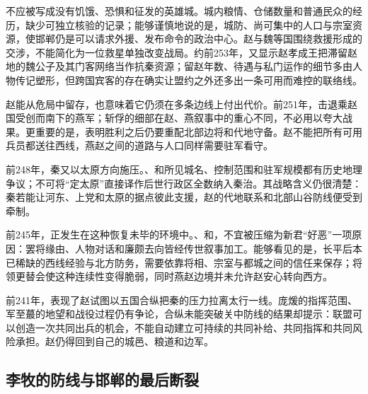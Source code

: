 不应被写成没有饥饿、恐惧和征发的英雄城。城内粮情、仓储数量和普通民众的经历，缺少可独立核验的记录；能够谨慎地说的是，城防、尚可集中的人口与宗室资源，使邯郸仍是可以请求外援、发布命令的政治中心。赵与魏等国围绕救援形成的交涉，不能简化为一位救星单独改变战局。约前253年，又显示赵孝成王把滞留赵地的魏公子及其门客网络当作抗秦资源；留赵年数、待遇与私门运作的细节多由人物传记塑形，但跨国宾客的存在确实让盟约之外还多出一条可用而难控的联络线。

赵能从危局中留存，也意味着它仍须在多条边线上付出代价。前251年，击退乘赵国受创而南下的燕军；斩俘的细部在赵、燕叙事中的重心不同，不必用以夸大战果。更重要的是，表明胜利之后仍要重配北部边将和代地守备。赵不能把所有可用兵员都送往西线，燕赵之间的道路与人口同样需要驻军看守。

前248年，秦又以太原方向施压。、和所见城名、控制范围和驻军规模都有历史地理争议；不可将“定太原”直接译作后世行政区全数纳入秦治。其战略含义仍很清楚：秦若能让河东、上党和太原的据点彼此支援，赵的代地联系和北部山谷防线便受到牵制。

前245年，正发生在这种恢复未毕的环境中。、和，不宜被压缩为新君“好恶”一项原因：罢将缘由、人物对话和廉颇去向皆经传世叙事加工。能够看见的是，长平后本已稀缺的西线经验与北方防务，需要依靠将相、宗室与都城之间的信任来保存；将领更替会使这种连续性变得脆弱，同时燕赵边境并未允许赵安心转向西方。

前241年，表现了赵试图以五国合纵把秦的压力拉离太行一线。庞煖的指挥范围、军至蕞的地望和战役过程仍有争论，合纵未能突破关中防线的结果却提示：联盟可以创造一次共同出兵的机会，不能自动建立可持续的共同补给、共同指挥和共同风险承担。赵仍得回到自己的城邑、粮道和边军。

\subsection{李牧的防线与邯郸的最后断裂}

